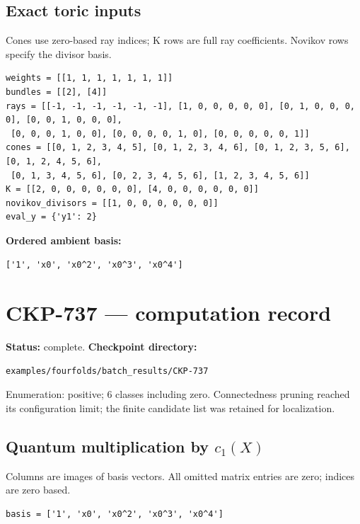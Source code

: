 \documentclass[10pt,a4paper]{article}
\begin{document}
\subsection*{Exact toric inputs}
Cones use zero-based ray indices; K rows are full ray coefficients. Novikov rows specify the divisor basis.

\begin{lstlisting}
weights = [[1, 1, 1, 1, 1, 1, 1]]
bundles = [[2], [4]]
rays = [[-1, -1, -1, -1, -1, -1], [1, 0, 0, 0, 0, 0], [0, 1, 0, 0, 0, 0], [0, 0, 1, 0, 0, 0],
 [0, 0, 0, 1, 0, 0], [0, 0, 0, 0, 1, 0], [0, 0, 0, 0, 0, 1]]
cones = [[0, 1, 2, 3, 4, 5], [0, 1, 2, 3, 4, 6], [0, 1, 2, 3, 5, 6], [0, 1, 2, 4, 5, 6],
 [0, 1, 3, 4, 5, 6], [0, 2, 3, 4, 5, 6], [1, 2, 3, 4, 5, 6]]
K = [[2, 0, 0, 0, 0, 0, 0], [4, 0, 0, 0, 0, 0, 0]]
novikov_divisors = [[1, 0, 0, 0, 0, 0, 0]]
eval_y = {'y1': 2}
\end{lstlisting}

\textbf{Ordered ambient basis:}
\begin{lstlisting}
['1', 'x0', 'x0^2', 'x0^3', 'x0^4']
\end{lstlisting}

\clearpage\section*{CKP-737 --- computation record}
\textbf{Status:} complete.
\textbf{Checkpoint directory:}
\begin{lstlisting}
examples/fourfolds/batch_results/CKP-737
\end{lstlisting}

Enumeration: positive; 6 classes including zero.
Connectedness pruning reached its configuration limit; the finite candidate list was retained for localization.
\subsection*{Quantum multiplication by $c_1(X)$}
Columns are images of basis vectors. All omitted matrix entries are zero; indices are zero based.

\begin{lstlisting}
basis = ['1', 'x0', 'x0^2', 'x0^3', 'x0^4']
\end{lstlisting}
\end{document}
